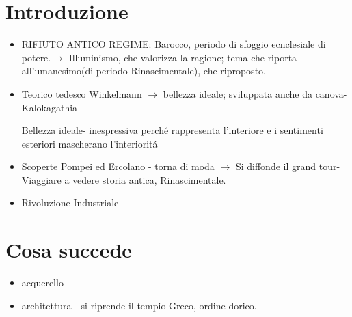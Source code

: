 \documentclass{article}
\title{\jobname}
\author{Eugenio Animali}
\begin{document}
\maketitle

\section*{Introduzione}

\begin{itemize}

\item RIFIUTO ANTICO REGIME: Barocco, periodo di sfoggio ecnclesiale di potere.$\to$ Illuminismo, che valorizza la ragione; tema che riporta all'umanesimo(di periodo Rinascimentale), che riproposto.
\item Teorico tedesco Winkelmann $\to$ bellezza ideale; sviluppata anche da canova- Kalokagathia
\begin{center}
    Bellezza ideale- inespressiva perché rappresenta l'interiore e i sentimenti esteriori mascherano l'interioritá
\end{center}
\item Scoperte Pompei ed Ercolano - torna di moda $\to$ Si diffonde il grand tour- Viaggiare a vedere storia antica, Rinascimentale.
\item Rivoluzione Industriale
\end{itemize}
\section*{Cosa succede}
\begin{itemize}
    \item acquerello
    \item architettura - si riprende il tempio Greco, ordine dorico.
\end{itemize}
\end{document}
